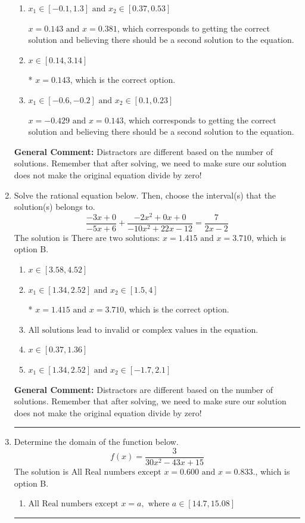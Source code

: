 \documentclass{extbook}[14pt]
\newcommand{\litem}[1]{\item #1

\rule{\textwidth}{0.4pt}}
\begin{document}
\begin{enumerate}
{\begin{enumerate}[label=\Alph*.]
$x = -0.429$, which corresponds to not distributing the factor $-7x + 2$ correctly when trying to eliminate the fraction.
\item \( x_1 \in [-0.1, 1.3] \text{ and } x_2 \in [0.37,0.53] \)

$x = 0.143 \text{ and } x = 0.381$, which corresponds to getting the correct solution and believing there should be a second solution to the equation.
\item \( x \in [0.14,3.14] \)

* $x = 0.143$, which is the correct option.
\item \( x_1 \in [-0.6, -0.2] \text{ and } x_2 \in [0.1,0.23] \)

$x = -0.429 \text{ and } x = 0.143$, which corresponds to getting the correct solution and believing there should be a second solution to the equation.
\end{enumerate}

\textbf{General Comment:} Distractors are different based on the number of solutions. Remember that after solving, we need to make sure our solution does not make the original equation divide by zero!
}
\litem{
Solve the rational equation below. Then, choose the interval(s) that the solution(s) belongs to.
\[ \frac{-3x + 0}{-5x + 6} + \frac{-2x^{2} +0 x + 0}{-10x^{2} +22 x -12} = \frac{7}{2x -2} \]The solution is \( \text{There are two solutions: } x = 1.415 \text{ and } x = 3.710 \), which is option B.\begin{enumerate}[label=\Alph*.]
\item \( x \in [3.58,4.52] \)


\item \( x_1 \in [1.34, 2.52] \text{ and } x_2 \in [1.5,4] \)

* $x = 1.415 \text{ and } x = 3.710$, which is the correct option.
\item \( \text{All solutions lead to invalid or complex values in the equation.} \)


\item \( x \in [0.37,1.36] \)


\item \( x_1 \in [1.34, 2.52] \text{ and } x_2 \in [-1.7,2.1] \)


\end{enumerate}

\textbf{General Comment:} Distractors are different based on the number of solutions. Remember that after solving, we need to make sure our solution does not make the original equation divide by zero!
}
\litem{
Determine the domain of the function below.
\[ f(x) = \frac{3}{30x^{2} -43 x + 15} \]The solution is \( \text{All Real numbers except } x = 0.600 \text{ and } x = 0.833. \), which is option B.\begin{enumerate}[label=\Alph*.]
\item \( \text{All Real numbers except } x = a, \text{ where } a \in [14.7, 15.08] \)


\end{enumerate}}
\end{enumerate}
\end{document}
